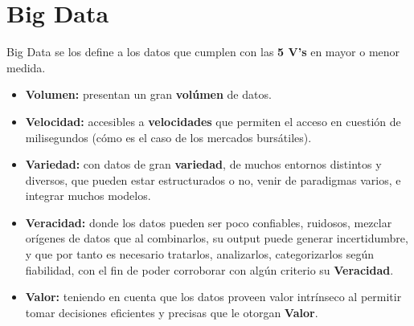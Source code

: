 \section*{Big Data}

Big Data se los define a los datos que cumplen con las \textbf{5 V's} en mayor o menor medida.

\begin{itemize}
    \item \textbf{Volumen:} presentan un gran \textbf{volúmen} de datos.
    \item \textbf{Velocidad:} accesibles a \textbf{velocidades} que permiten el acceso en cuestión de milisegundos (cómo es el caso de los mercados bursátiles).
    \item \textbf{Variedad:} con datos de gran \textbf{variedad}, de muchos entornos distintos y diversos, que pueden estar estructurados o no, venir de paradigmas varios, e integrar muchos modelos.
    \item \textbf{Veracidad:} donde los datos pueden ser poco confiables, ruidosos, mezclar orígenes de datos que al combinarlos, su output puede generar incertidumbre, y que por tanto es necesario tratarlos, analizarlos, categorizarlos según fiabilidad, con el fin de poder corroborar con algún criterio su \textbf{Veracidad}.
    \item \textbf{Valor:} teniendo en cuenta que los datos proveen valor intrínseco al permitir tomar decisiones eficientes y precisas que le otorgan \textbf{Valor}.
\end{itemize}